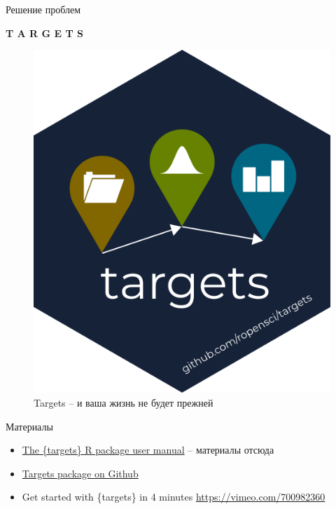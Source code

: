 \documentclass[
  ignorenonframetext,
]{beamer}
\begin{document}
\begin{frame}{Решение проблем}
\label{ux440ux435ux448ux435ux43dux438ux435-ux43fux440ux43eux431ux43bux435ux43c}
\begin{block}{\textbf{T A R G E T S}}
\label{t-a-r-g-e-t-s}
\begin{figure}[H]

{\centering \includegraphics{Sources/logo.png}

}

\caption{Targets -- и ваша жизнь не будет прежней}

\end{figure}%
\end{block}
\end{frame}

\begin{frame}{Материалы}
\label{ux43cux430ux442ux435ux440ux438ux430ux43bux44b}
\begin{itemize}
\item
  \href{https://books.ropensci.org/targets/}{The \{targets\} R package
  user manual} -- материалы отсюда
\item
  \href{https://github.com/ropensci/targets}{Targets package on Github}
\item
  Get started with \{targets\} in 4 minutes
  \url{https://vimeo.com/700982360}
\end{itemize}
\end{frame}
\end{document}
